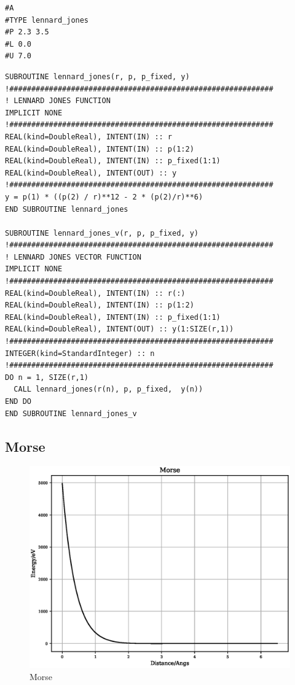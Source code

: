 \begin{lstlisting}[style=sPseudo,caption={Lennard-Jones potential input file}]
#A
#TYPE lennard_jones
#P 2.3 3.5
#L 0.0
#U 7.0
\end{lstlisting}

\begin{lstlisting}[style=sPseudo,caption={Lennard-Jones subroutine}]
SUBROUTINE lennard_jones(r, p, p_fixed, y)
!############################################################
! LENNARD JONES FUNCTION
IMPLICIT NONE
!############################################################
REAL(kind=DoubleReal), INTENT(IN) :: r
REAL(kind=DoubleReal), INTENT(IN) :: p(1:2)
REAL(kind=DoubleReal), INTENT(IN) :: p_fixed(1:1)
REAL(kind=DoubleReal), INTENT(OUT) :: y
!############################################################
y = p(1) * ((p(2) / r)**12 - 2 * (p(2)/r)**6)
END SUBROUTINE lennard_jones

SUBROUTINE lennard_jones_v(r, p, p_fixed, y)
!############################################################
! LENNARD JONES VECTOR FUNCTION
IMPLICIT NONE
!############################################################
REAL(kind=DoubleReal), INTENT(IN) :: r(:)
REAL(kind=DoubleReal), INTENT(IN) :: p(1:2)
REAL(kind=DoubleReal), INTENT(IN) :: p_fixed(1:1)
REAL(kind=DoubleReal), INTENT(OUT) :: y(1:SIZE(r,1))
!############################################################
INTEGER(kind=StandardInteger) :: n
!############################################################
DO n = 1, SIZE(r,1)
  CALL lennard_jones(r(n), p, p_fixed,  y(n))
END DO
END SUBROUTINE lennard_jones_v
\end{lstlisting}




\clearpage
\FloatBarrier
\subsection{Morse}

\begin{figure}[h]
  \begin{center}
    \includegraphics[width=120mm]{appendix/functions/plots/morse.eps}
    \caption{Morse}
    \label{graph:MorsePotential}
  \end{center}
\end{figure}

